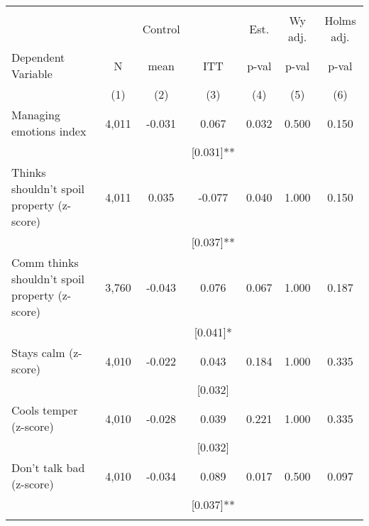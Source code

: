 \begin{tabular}{lcccccc}
\hline \noalign{\smallskip} &  &  &  &  &  & \\
 &  & Control &  & Est. & Wy adj. & Holms adj.\\
Dependent Variable & N & mean & ITT & p-val & p-val & p-val\\
 & (1) & (2) & (3) & (4) & (5) & (6)\\
\noalign{\smallskip}\hline \noalign{\smallskip}\quad Managing emotions index & 4,011 & -0.031 & 0.067 & 0.032 & 0.500 & 0.150\\
 &  &  & [0.031]** &  &  & \\
\quad Thinks shouldn't spoil property (z-score) & 4,011 & 0.035 & -0.077 & 0.040 & 1.000 & 0.150\\
 &  &  & [0.037]** &  &  & \\
\quad Comm thinks shouldn't spoil property (z-score) & 3,760 & -0.043 & 0.076 & 0.067 & 1.000 & 0.187\\
 &  &  & [0.041]* &  &  & \\
\quad Stays calm (z-score) & 4,010 & -0.022 & 0.043 & 0.184 & 1.000 & 0.335\\
 &  &  & [0.032] &  &  & \\
\quad Cools temper (z-score) & 4,010 & -0.028 & 0.039 & 0.221 & 1.000 & 0.335\\
 &  &  & [0.032] &  &  & \\
\quad Don't talk bad (z-score) & 4,010 & -0.034 & 0.089 & 0.017 & 0.500 & 0.097\\
 &  &  & [0.037]** &  &  & \\
\noalign{\smallskip}\hline\end{tabular}
